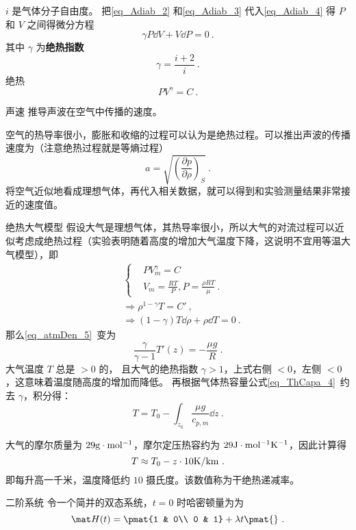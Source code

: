 $i$ 是气体分子自由度。 把\autoref{eq_Adiab_2} 和\autoref{eq_Adiab_3} 代入\autoref{eq_Adiab_4} 得 $P$ 和 $V$ 之间得微分方程
\begin{equation}
\gamma P\dd{V} + V \dd{P} = 0~.
\end{equation}
其中 $\gamma$ 为\textbf{绝热指数}
\begin{equation}
\gamma = \frac{i+2}{i}~.
\end{equation}
绝热
\begin{equation}
P V^\gamma = C~.
\end{equation}


\begin{example}{声速}
推导声波在空气中传播的速度。

空气的热导率很小，膨胀和收缩的过程可以认为是绝热过程。可以推出声波的传播速度为（注意绝热过程就是等熵过程）
\begin{equation}
a=\sqrt{\left(\frac{\partial p}{\partial \rho}\right)_S}~.
\end{equation}
将空气近似地看成理想气体，再代入相关数据，就可以得到和实验测量结果非常接近的速度值。
\end{example}
\begin{example}{绝热大气模型}
假设大气是理想气体，其热导率很小，所以大气的对流过程可以近似考虑成绝热过程（实验表明随着高度的增加大气温度下降，这说明不宜用等温大气模型），即
\begin{equation}
\begin{aligned}
&\begin{cases}
&PV_m^\gamma=C\\
&V_m=\frac{RT}{P},P=\frac{\rho R T}{\mu}~.
\end{cases}
\\
&\Rightarrow \rho^{1-\gamma}T=C'~,\\
&\Rightarrow (1-\gamma)T\dd \rho+\rho\dd T=0~.
\end{aligned}
\end{equation}
那么\autoref{eq_atmDen_5}~变为
\begin{equation}
\frac{\gamma}{\gamma-1}T'(z)=-\frac{\mu g}{R}~.
\end{equation}
大气温度 $T$ 总是 $>0$ 的， 且大气的绝热指数 $\gamma>1$，上式右侧 $<0$，左侧 $<0$，这意味着温度随高度的增加而降低。 再根据气体热容量公式\autoref{eq_ThCapa_4}~约去 $\gamma$，积分得：
\begin{equation}\label{eq_Adiab_6}
T=T_0-\int_{z_0}\frac{\mu g}{c_{p,m}} \dd z ~.
\end{equation}


大气的摩尔质量为 $29 \rm{g\cdot mol^{-1}}$，摩尔定压热容约为 $29 \rm{J\cdot mol^{-1}K^{-1}}$，因此计算得
\begin{equation}
T\approx T_0-z\cdot 10 \rm{K/km}~.
\end{equation}
即每升高一千米，温度降低约 $10$ 摄氏度。该数值称为干绝热递减率。
\end{example}

\begin{example}{二阶系统}
令一个简并的双态系统，$t=0$ 时哈密顿量为为
\begin{equation}
\mat H(t) = \pmat{1 & 0\\ 0 & 1}
+ \lambda t \pmat{}~.
\end{equation}
\end{example}
